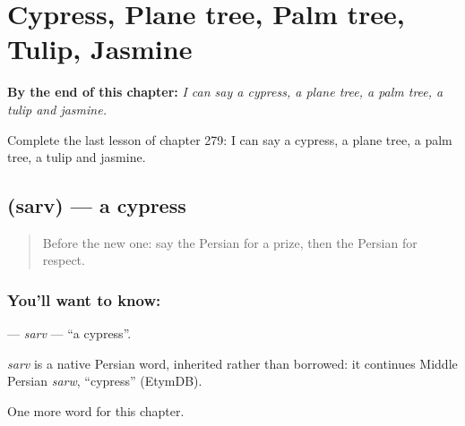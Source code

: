 
\chapter{Cypress, Plane tree, Palm tree, Tulip, Jasmine}
\label{ch:fa-cypress-plane-tree-palm-tree-tulip-jasmine}

\begin{chapteropening}
\textbf{By the end of this chapter:} \emph{I can say a cypress, a plane tree, a palm tree, a tulip and jasmine.}

Complete the last lesson of chapter 279: I can say a cypress, a plane tree, a palm tree, a tulip and jasmine.
\end{chapteropening}

\section[\texorpdfstring{\fa{سرو} (sarv)}{سرو (sarv)}]{ (sarv) — a cypress}

\label{lesson:FA-C279-sarv}



\begin{quote}
Before the new one: say the Persian for a prize, then the Persian for respect.
\end{quote}

\subsection*{You'll want to know: }
\textbf{} — \emph{sarv} — \textquotedblleft{}a cypress\textquotedblright{}.

\begin{cousinweb}
\emph{sarv} is a native Persian word, inherited rather than borrowed: it continues Middle Persian \emph{sarw}, \textquotedblleft{}cypress\textquotedblright{} (EtymDB).
\end{cousinweb}

\begin{grammarlens}[title={What you've built}]
One more word for this chapter.
\end{grammarlens}

